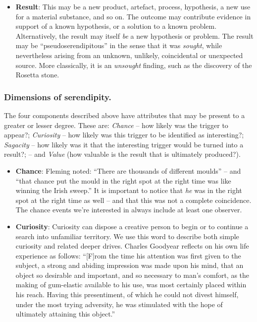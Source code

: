 \begin{itemize}
\item \textbf{Result}: This may be a new product, artefact, process,
  hypothesis, a new use for a material substance, and so on.  The
  outcome may contribute evidence in support of a known hypothesis, or
  a solution to a known problem.  Alternatively, the result may itself
  {\em be} a new hypothesis or problem.  The result may be
  ``pseudoserendipitous'' in the sense that it was {\em sought}, while
  nevertheless arising from an unknown, unlikely, coincidental or
  unexpected source.  More classically, it is an \emph{unsought}
  finding, such as the discovery of the Rosetta stone.
\end{itemize}

\subsubsection{Dimensions of serendipity.}

The four components described above have attributes that may be present to a greater or lesser degree.  These are: \emph{Chance} -- how likely was the trigger to appear?; \emph{Curiosity} -- how likely was this trigger to be identified as interesting?; \emph{Sagacity} -- how likely was it that the interesting trigger would be turned into a result?; -- and \emph{Value} (how valuable is the result that is ultimately produced?).

\begin{itemize}
\item \textbf{Chance}: Fleming \citeyear{fleming} noted: ``There are
  thousands of different moulds'' -- and ``that chance put the mould
  in the right spot at the right time was like winning the Irish
  sweep.''  It is important to notice that \emph{he} was in the right
  spot at the right time as well -- and that this was not a complete
  coincidence.  The chance events we're interested in always include
  at least one observer.
\end{itemize}

\begin{itemize}
\item \textbf{Curiosity}: Curiosity can dispose a creative person to
  begin or to continue a search into unfamiliar territory.  We use
  this word to describe both simple curiosity and related deeper
  drives.  Charles Goodyear \citeyear{goodyear1855gum} reflects on his
  own life experience as follows: ``[F]rom the time his attention was first given
  to the subject, a strong and abiding impression was made upon his
  mind, that an object so desirable and important, and so necessary to
  man's comfort, as the making of gum-elastic available to his use,
  was most certainly placed within his reach.  Having this
  presentiment, of which he could not divest himself, under the most
  trying adversity, he was stimulated with the hope of ultimately
  attaining this object.''
\end{itemize}

